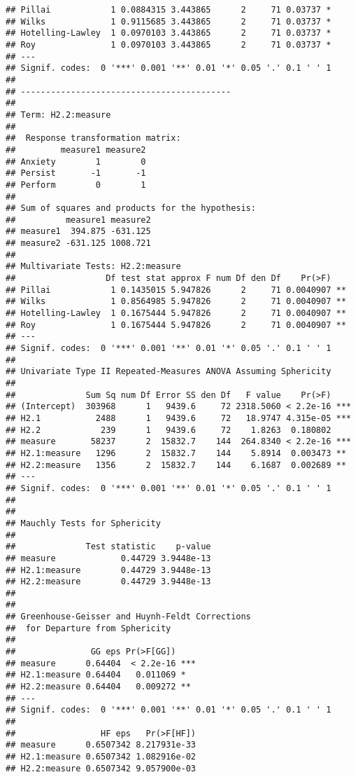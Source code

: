 \documentclass{article}\usepackage[]{graphicx}\usepackage[]{color}
\makeatletter
\newenvironment{kframe}{%
 \def\at@end@of@kframe{}%
 \ifinner\ifhmode%
  \def\at@end@of@kframe{\end{minipage}}%
  \begin{minipage}{\columnwidth}%
 \fi\fi%
 \def\FrameCommand##1{\hskip\@totalleftmargin \hskip-\fboxsep
 \colorbox{shadecolor}{##1}\hskip-\fboxsep
     \hskip-\linewidth \hskip-\@totalleftmargin \hskip\columnwidth}%
 \MakeFramed {\advance\hsize-\width
   \@totalleftmargin\z@ \linewidth\hsize
   \@setminipage}}%
 {\par\unskip\endMakeFramed%
 \at@end@of@kframe}
\newenvironment{knitrout}{}{} %
\makeatother
\begin{document}
\begin{knitrout}
\begin{kframe}
\begin{verbatim}
## Pillai            1 0.0884315 3.443865      2     71 0.03737 *
## Wilks             1 0.9115685 3.443865      2     71 0.03737 *
## Hotelling-Lawley  1 0.0970103 3.443865      2     71 0.03737 *
## Roy               1 0.0970103 3.443865      2     71 0.03737 *
## ---
## Signif. codes:  0 '***' 0.001 '**' 0.01 '*' 0.05 '.' 0.1 ' ' 1
## 
## ------------------------------------------
##  
## Term: H2.2:measure 
## 
##  Response transformation matrix:
##         measure1 measure2
## Anxiety        1        0
## Persist       -1       -1
## Perform        0        1
## 
## Sum of squares and products for the hypothesis:
##          measure1 measure2
## measure1  394.875 -631.125
## measure2 -631.125 1008.721
## 
## Multivariate Tests: H2.2:measure
##                  Df test stat approx F num Df den Df    Pr(>F)   
## Pillai            1 0.1435015 5.947826      2     71 0.0040907 **
## Wilks             1 0.8564985 5.947826      2     71 0.0040907 **
## Hotelling-Lawley  1 0.1675444 5.947826      2     71 0.0040907 **
## Roy               1 0.1675444 5.947826      2     71 0.0040907 **
## ---
## Signif. codes:  0 '***' 0.001 '**' 0.01 '*' 0.05 '.' 0.1 ' ' 1
## 
## Univariate Type II Repeated-Measures ANOVA Assuming Sphericity
## 
##              Sum Sq num Df Error SS den Df   F value    Pr(>F)    
## (Intercept)  303968      1   9439.6     72 2318.5060 < 2.2e-16 ***
## H2.1           2488      1   9439.6     72   18.9747 4.315e-05 ***
## H2.2            239      1   9439.6     72    1.8263  0.180802    
## measure       58237      2  15832.7    144  264.8340 < 2.2e-16 ***
## H2.1:measure   1296      2  15832.7    144    5.8914  0.003473 ** 
## H2.2:measure   1356      2  15832.7    144    6.1687  0.002689 ** 
## ---
## Signif. codes:  0 '***' 0.001 '**' 0.01 '*' 0.05 '.' 0.1 ' ' 1
## 
## 
## Mauchly Tests for Sphericity
## 
##              Test statistic    p-value
## measure             0.44729 3.9448e-13
## H2.1:measure        0.44729 3.9448e-13
## H2.2:measure        0.44729 3.9448e-13
## 
## 
## Greenhouse-Geisser and Huynh-Feldt Corrections
##  for Departure from Sphericity
## 
##               GG eps Pr(>F[GG])    
## measure      0.64404  < 2.2e-16 ***
## H2.1:measure 0.64404   0.011069 *  
## H2.2:measure 0.64404   0.009272 ** 
## ---
## Signif. codes:  0 '***' 0.001 '**' 0.01 '*' 0.05 '.' 0.1 ' ' 1
## 
##                 HF eps   Pr(>F[HF])
## measure      0.6507342 8.217931e-33
## H2.1:measure 0.6507342 1.082916e-02
## H2.2:measure 0.6507342 9.057900e-03
\end{verbatim}
\end{kframe}
\end{knitrout}
\end{document}
